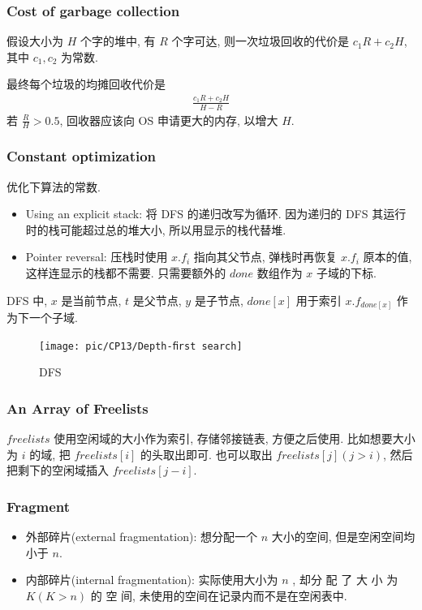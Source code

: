 \subsubsection{Cost of garbage collection}
假设大小为 $H$ 个字的堆中, 有 $R$ 个字可达, 则一次垃圾回收的代价是 $c_1R+c_2H$, 其中 $c_1, c_2$ 为常数. 

最终每个垃圾的均摊回收代价是 
\begin{align*}
    \frac{c_1R+c_2H}{H-R}
\end{align*}
若 $\frac{R}{H}>0.5$, 回收器应该向 OS 申请更大的内存, 以增大 $H$.

\subsubsection{Constant optimization}
优化下算法的常数. 

\begin{itemize}
    \item Using an explicit stack: 将 DFS 的递归改写为循环. 因为递归的 DFS 其运行时的栈可能超过总的堆大小, 所以用显示的栈代替堆.
    \item Pointer reversal: 压栈时使用 $x.f_i$ 指向其父节点, 弹栈时再恢复 $x.f_i$ 原本的值, 这样连显示的栈都不需要. 只需要额外的 $done$ 数组作为 $x$ 子域的下标.
\end{itemize}

DFS 中, $x$ 是当前节点, $t$ 是父节点, $y$ 是子节点, $done[x]$ 用于索引 $x.f_{done[x]}$ 作为下一个子域. 

\begin{figure}[!htb]
    \centering
    \texttt{[image: pic/CP13/Depth-ﬁrst search]}
    \caption{DFS}
\end{figure}


\subsubsection{An Array of Freelists} 
$freelists$ 使用空闲域的大小作为索引, 存储邻接链表, 方便之后使用. 比如想要大小为 $i$ 的域, 把 $freelists[i]$ 的头取出即可. 也可以取出 $freelists[j](j>i)$, 然后把剩下的空闲域插入 $freelists[j-i]$.


\subsubsection{Fragment}
\begin{itemize}
    \item 外部碎片(external fragmentation): 想分配一个 $n$ 大小的空间, 但是空闲空间均小于 $n$.
    \item 内部碎片(internal fragmentation): 实际使用大小为 $n$ , 却分 配 了 大 小 为 $K(K>n)$ 的 空 间, 未使用的空间在记录内而不是在空闲表中.
\end{itemize}


